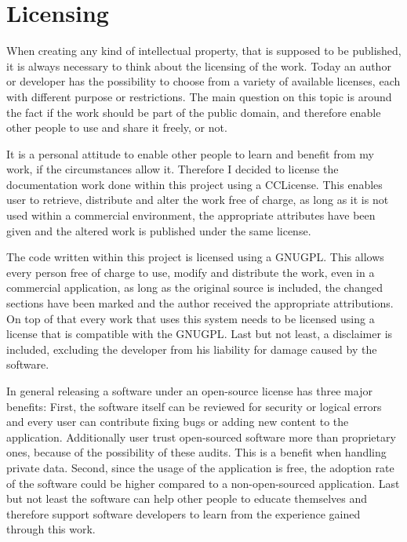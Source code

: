\section{Licensing}

When creating any kind of intellectual property, that is supposed to be published, it is always necessary to think about the licensing of the work. Today an author or developer has the possibility to choose from a variety of available licenses, each with different purpose or restrictions. The main question on this topic is around the fact if the work should be part of the public domain, and therefore enable other people to use and share it freely, or not. 

It is a personal attitude to enable other people to learn and benefit from my work, if the circumstances allow it. Therefore I decided to license the documentation work done within this project using a \gls{CCLicense}. This enables user to retrieve, distribute and alter the work free of charge, as long as it is not used within a commercial environment, the appropriate attributes have been given and the altered work is published under the same license. \cite{Commons:2015aa}

The code written within this project is licensed using a \gls{GNUGPL}. This allows every person free of charge to use, modify and distribute the work, even in a commercial application, as long as the original source is included, the changed sections have been marked and the author received the appropriate attributions. On top of that every work that uses this system needs to be licensed using a license that is compatible with the \gls{GNUGPL}. Last but not least, a disclaimer is included, excluding the developer from his liability for damage caused by the software. \cite{Foundation:1991aa}

In general releasing a software under an open-source license has three major benefits: First, the software itself can be reviewed for security or logical errors and every user can contribute fixing bugs or adding new content to the application. Additionally user trust open-sourced software more than proprietary ones, because of the possibility of these audits. This is a benefit when handling private data. Second, since the usage of the application is free, the adoption rate of the software could be higher compared to a non-open-sourced application. Last but not least the software can help other people to educate themselves and therefore support software developers to learn from the experience gained through this work.


